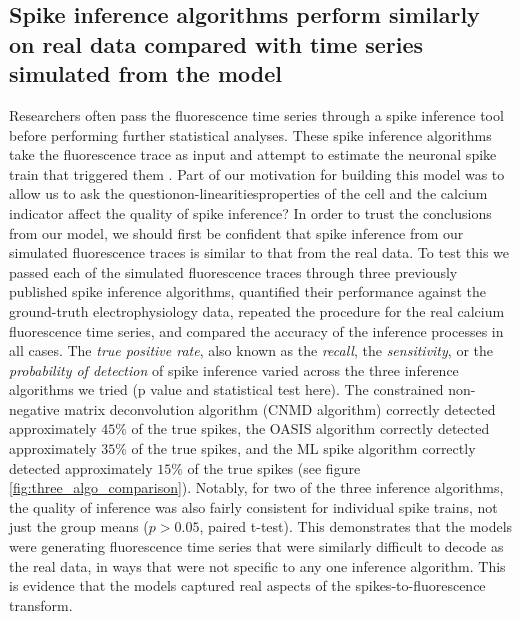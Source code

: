 \subsection{Spike inference algorithms perform similarly on real data compared with time series simulated from the model}
Researchers often pass the fluorescence time series through a spike inference tool before performing further statistical analyses. These spike inference algorithms take the fluorescence trace as input and attempt to estimate the neuronal spike train that triggered them \parencite{vogelstein, pnevmatikakis, friedrich, paninski1, paninski2, deneux}. Part of our motivation for building this model was to allow us to ask the questionon-linearitiesproperties of the cell and the calcium indicator affect the quality of spike inference? In order to trust the conclusions from our model, we should first be confident that spike inference from our simulated fluorescence traces is similar to that from the real data. To test this we passed each of the simulated fluorescence traces through three previously published spike inference algorithms, quantified their performance against the ground-truth electrophysiology data, repeated the procedure for the real calcium fluorescence time series, and compared the accuracy of the inference processes in all cases. The \textit{true positive rate}, also known as the \textit{recall}, the \textit{sensitivity}, or the \textit{probability of detection} of spike inference varied across the three inference algorithms we tried (p value and statistical test here). The constrained non-negative matrix deconvolution algorithm  \parencite{pnevmatikakis} (CNMD algorithm) correctly detected approximately $45\%$ of the true spikes, the OASIS algorithm  \parencite{friedrich} correctly detected approximately $35\%$ of the true spikes, and the ML spike algorithm  \parencite{deneux} correctly detected approximately $15\%$ of the true spikes (see figure \ref{fig:three_algo_comparison}). Notably, for two of the three inference algorithms, the quality of inference was also fairly consistent for individual spike trains, not just the group means ($p > 0.05$, paired t-test). This demonstrates that the models were generating fluorescence time series that were similarly difficult to decode as the real data, in ways that were not specific to any one inference algorithm. This is evidence that the models captured real aspects of the spikes-to-fluorescence transform.
